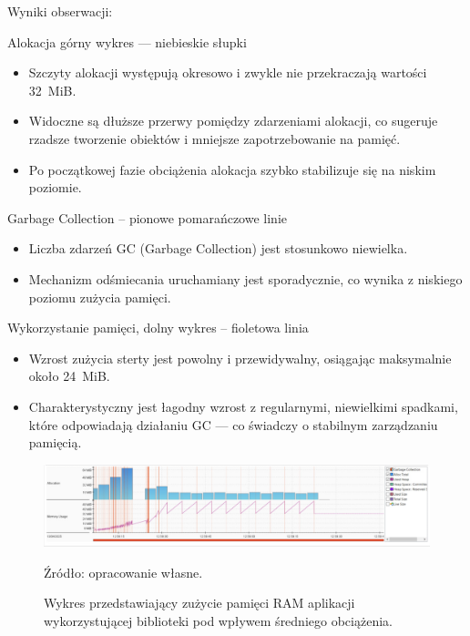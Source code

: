 \documentclass[runningheads,12pt]{llncs}
\begin{document}
Wyniki obserwacji:

Alokacja górny wykres — niebieskie słupki

\begin{itemize}
  \item Szczyty alokacji występują okresowo i zwykle nie przekraczają wartości 32~MiB.
  \item Widoczne są dłuższe przerwy pomiędzy zdarzeniami alokacji, co sugeruje rzadsze tworzenie obiektów i mniejsze zapotrzebowanie na pamięć.
  \item Po początkowej fazie obciążenia alokacja szybko stabilizuje się na niskim poziomie.
\end{itemize}

Garbage Collection – pionowe pomarańczowe linie

\begin{itemize}
  \item Liczba zdarzeń GC (Garbage Collection) jest stosunkowo niewielka.
  \item Mechanizm odśmiecania uruchamiany jest sporadycznie, co wynika z niskiego poziomu zużycia pamięci.
\end{itemize}

Wykorzystanie pamięci, dolny wykres – fioletowa linia

\begin{itemize}
  \item Wzrost zużycia sterty jest powolny i przewidywalny, osiągając maksymalnie około 24~MiB.
  \item Charakterystyczny jest łagodny wzrost z regularnymi, niewielkimi spadkami, które odpowiadają działaniu GC — co świadczy o stabilnym zarządzaniu pamięcią.
\end{itemize}

\newpage

\begin{figure}
    \includegraphics[width=\linewidth]{images/library-memory-midle-graph.jpg}
    \caption{Wykres przedstawiający zużycie pamięci RAM aplikacji wykorzystującej biblioteki pod wpływem średniego obciążenia.} \label{fig1}
    \vspace{0.5em}
    {\small Źródło: opracowanie własne.}
\end{figure}
\end{document}
